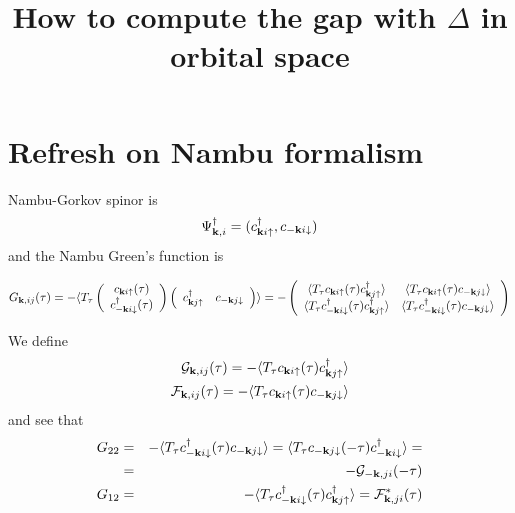 \documentclass[twocolumn,prb,preprintnumbers,amsmath,amssymb,floatfix]{revtex4}
\newcommand{\cG}{{\cal G}}
\newcommand{\cF}{{\cal F}} \newcommand{\cD}{{\cal D}}
\newcommand{\up}{\uparrow}
\newcommand{\dn}{\downarrow}
\begin{document}
\setlength{\pdfpageheight}{\paperheight}
\setlength{\pdfpagewidth}{\paperwidth}


\title{How to compute the gap with $\Delta$ in orbital space}
\maketitle

\section{Refresh on Nambu formalism}

Nambu-Gorkov spinor is
\begin{eqnarray}
\Psi^\dagger_{\vk,i}=(c_{\vk i \up}^\dagger, c_{-\vk i \dn})  
\end{eqnarray}
and the Nambu Green's function is
\begin{widetext}
\begin{eqnarray}
G_{\vk,ij}(\tau)=-\langle T_\tau
\left(
\begin{array}{c}
c_{\vk i \up}(\tau)\\
c^\dagger_{-\vk i \dn}(\tau)
\end{array}
\right)
\left(
\begin{array}{cc}
c^\dagger_{\vk j \up} & c_{-\vk j \dn}
\end{array}
\right)\rangle
=-
\left(
\begin{array}{cc}
\langle T_\tau c_{\vk i \up}(\tau) c^\dagger_{\vk j \up}\rangle  &\langle T_\tau c_{\vk i \up}(\tau) c_{-\vk j \dn}\rangle\\
\langle T_\tau c^\dagger_{-\vk i \dn}(\tau) c^\dagger_{\vk j \up}\rangle & \langle T_\tau c^\dagger_{-\vk i \dn}(\tau) c_{-\vk j \dn}\rangle
\end{array}
\right)
\end{eqnarray}
\end{widetext}

We define
\begin{eqnarray}
\cG_{\vk,ij}(\tau) = -\langle T_\tau c_{\vk i \up}(\tau) c^\dagger_{\vk j \up}\rangle\\
\cF_{\vk,ij}(\tau) = -\langle T_\tau c_{\vk i \up}(\tau) c_{-\vk j \dn}\rangle
\end{eqnarray}
and see that
\begin{eqnarray}
G_{22}&=&-\langle T_\tau c^\dagger_{-\vk i \dn}(\tau) c_{-\vk j \dn}\rangle=
\langle T_\tau c_{-\vk j \dn}(-\tau) c^\dagger_{-\vk i \dn} \rangle=
\nonumber\\
&=&-\cG_{-\vk,ji}(-\tau)\nonumber\\
G_{12}&=&-\langle T_\tau c^\dagger_{-\vk i \dn}(\tau) c^\dagger_{\vk j \up}\rangle=
\cF^*_{\vk,ji}(\tau)
\end{eqnarray}
\end{document}
